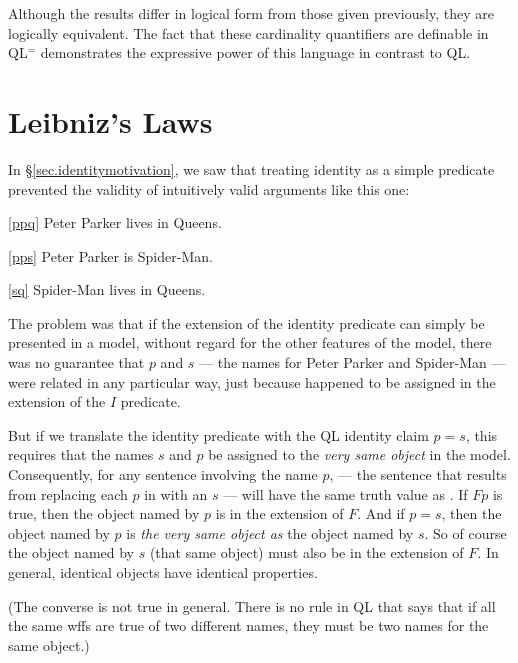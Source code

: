 Although the results differ in logical form from those given previously, they are logically equivalent.
The fact that these cardinality quantifiers are definable in QL$^=$ demonstrates the expressive power of this language in contrast to QL. 




\section{Leibniz's Laws}

In \S\ref{sec.identitymotivation}, we saw that treating identity as a simple predicate prevented the validity of intuitively valid arguments like  this one:

\begin{earg}
\item[\ref{ppq}] Peter Parker lives in Queens.
\item[\ref{pps}] Peter Parker is Spider-Man.
\item[\ref{sq}] Spider-Man lives in Queens.
\end{earg}

The problem was that if the extension of the identity predicate can simply be presented in a model, without regard for the other features of the model, there was no guarantee that $p$ and $s$ --- the names for Peter Parker and Spider-Man --- were related in any particular way, just because  happened to be assigned in the extension of the $I$ predicate.

But if we translate the identity predicate with the QL identity claim $p{=}s$, this requires that the names $s$ and $p$ be assigned to the \emph{very same object} in the model. Consequently, for any sentence \metaA{} involving the name $p$, \metaA{} --- the sentence that results from replacing each $p$ in \metaA{} with an $s$ --- will have the same truth value as \metaA{}. If $Fp$ is true, then the object named by $p$ is in the extension of $F$. And if $p{=}s$, then the object named by $p$ is \emph{the very same object as} the object named by $s$. So of course the object named by $s$ (that same object) must also be in the extension of $F$. In general, identical objects have identical properties.

(The converse is not true in general. There is no rule in QL that says that if all the same wffs are true of two different names, they must be two names for the same object.)

